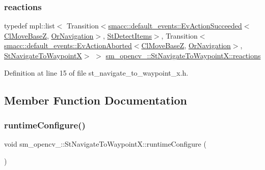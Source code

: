 \subsubsection{\texorpdfstring{reactions}{reactions}}
{\footnotesize\ttfamily typedef mpl\+::list$<$ Transition$<$\hyperlink{structsmacc_1_1default__events_1_1EvActionSucceeded}{smacc\+::default\+\_\+events\+::\+Ev\+Action\+Succeeded}$<$\hyperlink{classcl__move__base__z_1_1ClMoveBaseZ}{Cl\+Move\+BaseZ}, \hyperlink{classsm__opencv__3_1_1OrNavigation}{Or\+Navigation}$>$, \hyperlink{structsm__opencv__3_1_1StDetectItems}{St\+Detect\+Items}$>$, Transition$<$\hyperlink{structsmacc_1_1default__events_1_1EvActionAborted}{smacc\+::default\+\_\+events\+::\+Ev\+Action\+Aborted}$<$\hyperlink{classcl__move__base__z_1_1ClMoveBaseZ}{Cl\+Move\+BaseZ}, \hyperlink{classsm__opencv__3_1_1OrNavigation}{Or\+Navigation}$>$, \hyperlink{structsm__opencv__3_1_1StNavigateToWaypointX}{St\+Navigate\+To\+WaypointX}$>$ $>$ \hyperlink{structsm__opencv__3_1_1StNavigateToWaypointX_add68d576435c530956013e5fb88dc0e3}{sm\+\_\+opencv\+\_\+::\+St\+Navigate\+To\+Waypoint\+X\+::reactions}}



Definition at line 15 of file st\+\_\+navigate\+\_\+to\+\_\+waypoint\+\_\+x.\+h.



\subsection{Member Function Documentation}
\mbox{\label{structsm__opencv__3_1_1StNavigateToWaypointX_a3217837bae4e98a0b796bb094fb051c2}} 
\subsubsection{\texorpdfstring{runtime\+Configure()}{runtimeConfigure()}}
{\footnotesize\ttfamily void sm\+\_\+opencv\+\_\+::\+St\+Navigate\+To\+Waypoint\+X\+::runtime\+Configure (\begin{DoxyParamCaption}{ }\end{DoxyParamCaption})\hspace{0.3cm}{\ttfamily [inline]}}



